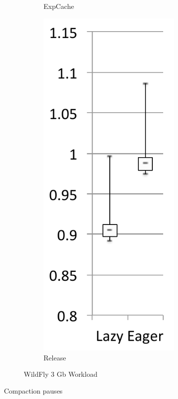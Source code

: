 \documentclass[sigplan,10pt,screen]{acmart}\settopmatter{printfolios=true,printccs=true,printacmref=true}
\begin{document}
\begin{figure}[bth]
\begin{subfigure}[b]{.48\textwidth}
\begin{subfigure}[b]{.24\textwidth}
    		\caption{ExpCache}
    	\end{subfigure}%
    	\begin{subfigure}[b]{.24\textwidth}
    		\includegraphics[width=\linewidth]{figures/wildflyRelease} 
    		\caption{Release}
   	\end{subfigure}   
	\caption*{WildFly 3 Gb Workload}
	\end{subfigure}	   
	\vspace{-0.8cm}
	\caption{Compaction pauses\vspace{-0.2cm}}
	\label{fig:compactPause}
\end{figure}
\end{document}
